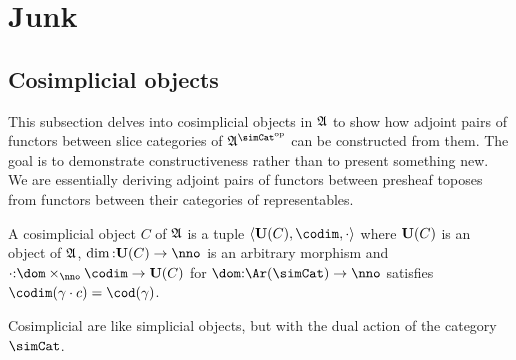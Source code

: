 \documentclass[csh.tex]{subfiles}
\begin{document}
\section{Junk}

\subsection{Cosimplicial objects}
This subsection delves into cosimplicial objects in $\mathfrak A$ to show how adjoint pairs of functors between slice categories of $\ambient\s$ can be constructed from them. The goal is to demonstrate constructiveness rather than to present something new. We are essentially deriving adjoint pairs of functors between presheaf toposes from functors between their categories of representables.

\begin{definition} A cosimplicial object $C$ of $\mathfrak A$ is a tuple $\tuplet{\base(C),\codim,\cdot}$ where $\mathbf{U}(C)$ is an object of $\mathfrak A$, $\dim\of\base(C)\to\nno$ is an arbitrary morphism and $\cdot\of \dom\times_{\nno}\codim \to \base (C)$ for $\dom\of \Ar(\simCat)\to\nno$
 satisfies $\codim(\gamma\cdot c) = \cod(\gamma)$.
\end{definition}

Cosimplicial are like simplicial objects, but with the dual action of the category $\simCat$.
\end{document}
